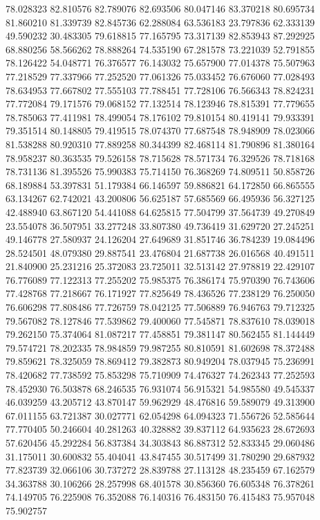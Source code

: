 78.028323
82.810576
82.789076
82.693506
80.047146
83.370218
80.695734
81.860210
81.339739
82.845736
62.288084
63.536183
23.797836
62.333139
49.590232
30.483305
79.618815
77.165795
73.317139
82.853943
87.292925
68.880256
58.566262
78.888264
74.535190
67.281578
73.221039
52.791855
78.126422
54.048771
76.376577
76.143032
75.657900
77.014378
75.507963
77.218529
77.337966
77.252520
77.061326
75.033452
76.676060
77.028493
78.634953
77.667802
77.555103
77.788451
77.728106
76.566343
78.824231
77.772084
79.171576
79.068152
77.132514
78.123946
78.815391
77.779655
78.785063
77.411981
78.499054
78.176102
79.810154
80.419141
79.933391
79.351514
80.148805
79.419515
78.074370
77.687548
78.948909
78.023066
81.538288
80.920310
77.889258
80.344399
82.468114
81.790896
81.380164
78.958237
80.363535
79.526158
78.715628
78.571734
76.329526
78.718168
78.731136
81.395526
75.990383
75.714150
76.368269
74.809511
50.858726
68.189884
53.397831
51.179384
66.146597
59.886821
64.172850
66.865555
63.134267
62.742021
43.200806
56.625187
57.685569
66.495936
56.327125
42.488940
63.867120
54.441088
64.625815
77.504799
37.564739
49.270849
23.554078
36.507951
33.277248
33.807380
49.736419
31.629720
27.245251
49.146778
27.580937
24.126204
27.649689
31.851746
36.784239
19.084496
28.524501
48.079380
29.887541
23.476804
21.687738
26.016568
40.491511
21.840900
25.231216
25.372083
23.725011
32.513142
27.978819
22.429107
76.776089
77.122313
77.255202
75.985375
76.386174
75.970390
76.743606
77.428768
77.218667
76.171927
77.825649
78.436526
77.238129
76.250050
76.606298
77.808486
77.726759
78.042125
77.506889
76.946763
79.712325
79.567082
78.127846
77.539862
79.400060
77.545871
78.837610
78.039018
79.262150
75.374064
81.087217
77.458851
79.381147
80.562455
81.144449
79.574721
78.202335
78.984859
79.987255
80.810591
81.602698
78.372488
79.859621
78.325059
78.869412
79.382873
80.949204
78.037945
75.236991
78.420682
77.738592
75.853298
75.710909
74.476327
74.262343
77.252593
78.452930
76.503878
68.246535
76.931074
56.915321
54.985580
49.545337
46.039259
43.205712
43.870147
59.962929
48.476816
59.589079
49.313900
67.011155
63.721387
30.027771
62.054298
64.094323
71.556726
52.585644
77.770405
50.246604
40.281263
40.328882
39.837112
64.935623
28.672693
57.620456
45.292284
56.837384
34.303843
86.887312
52.833345
29.060486
31.175011
30.600832
55.404041
43.847455
30.517499
31.780290
29.687932
77.823739
32.066106
30.737272
28.839788
27.113128
48.235459
67.162579
34.363788
30.106266
28.257998
68.401578
30.856360
76.605348
76.378261
74.149705
76.225908
76.352088
76.140316
76.483150
76.415483
75.957048
75.902757
